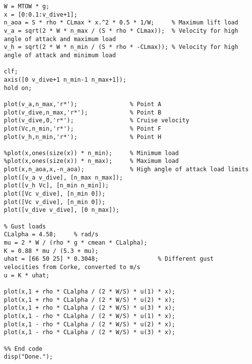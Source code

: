\begin{verbatim}
W = MTOW * g;
x = [0:0.1:v_dive+1];
n_aoa = S * rho * CLmax * x.^2 * 0.5 * 1/W;		% Maximum lift load
v_a = sqrt(2 * W * n_max / (S * rho * CLmax));	% Velocity for high angle of attack and maximum load
v_h = sqrt(2 * W * n_min / (S * rho * -CLmax));	% Velocity for high angle of attack and minimum load

clf;
axis([0 v_dive+1 n_min-1 n_max+1]);
hold on;

plot(v_a,n_max,'r*');				% Point A
plot(v_dive,n_max,'r*');			% Point B
plot(v_dive,0,'r*');				% Cruise velocity
plot(Vc,n_min,'r*');				% Point F
plot(v_h,n_min,'r*');				% Point H

%plot(x,ones(size(x)) * n_min);		% Minimum load
%plot(x,ones(size(x)) * n_max);		% Maximum load
plot(x,n_aoa,x,-n_aoa);				% High angle of attack load limits
plot([v_a v_dive], [n_max n_max]);
plot([v_h Vc], [n_min n_min]);
plot([Vc v_dive], [n_min 0]);
plot([Vc v_dive], [n_min 0]);
plot([v_dive v_dive], [0 n_max]);

% Gust loads
CLalpha = 4.58;		% rad/s
mu = 2 * W / (rho * g * cmean * CLalpha);
K = 0.88 * mu / (5.3 + mu);
uhat = [66 50 25] * 0.3048;					% Different gust velocities from Corke, converted to m/s
u = K * uhat;

plot(x,1 + rho * CLalpha / (2 * W/S) * u(1) * x);
plot(x,1 + rho * CLalpha / (2 * W/S) * u(2) * x);
plot(x,1 + rho * CLalpha / (2 * W/S) * u(3) * x);
plot(x,1 - rho * CLalpha / (2 * W/S) * u(1) * x);
plot(x,1 - rho * CLalpha / (2 * W/S) * u(2) * x);
plot(x,1 - rho * CLalpha / (2 * W/S) * u(3) * x);

%% End code
disp("Done.");
\end{verbatim}